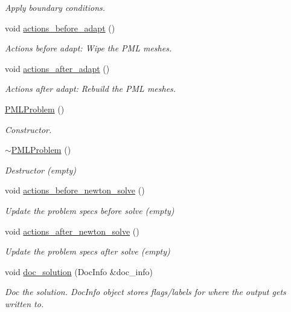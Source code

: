 \begin{DoxyCompactItemize}
\begin{DoxyCompactList}\small\item\em Apply boundary conditions. \end{DoxyCompactList}\item 
void \hyperlink{classPMLProblem_a310fb36ad1401d9d975957ecee43accc}{actions\+\_\+before\+\_\+adapt} ()
\begin{DoxyCompactList}\small\item\em Actions before adapt\+: Wipe the P\+ML meshes. \end{DoxyCompactList}\item 
void \hyperlink{classPMLProblem_a732f94d99e7ef65096d6e8d227f9cbc9}{actions\+\_\+after\+\_\+adapt} ()
\begin{DoxyCompactList}\small\item\em Actions after adapt\+: Rebuild the P\+ML meshes. \end{DoxyCompactList}\item 
\hyperlink{classPMLProblem_ae6cc833e2485ad6d37d6dd14105bf407}{P\+M\+L\+Problem} ()
\begin{DoxyCompactList}\small\item\em Constructor. \end{DoxyCompactList}\item 
\hyperlink{classPMLProblem_a4922fc5b0ef4cf43c41ee9149712adb1}{$\sim$\+P\+M\+L\+Problem} ()
\begin{DoxyCompactList}\small\item\em Destructor (empty) \end{DoxyCompactList}\item 
void \hyperlink{classPMLProblem_a13feb001d09f64dcfe44bbe3c6fe3d97}{actions\+\_\+before\+\_\+newton\+\_\+solve} ()
\begin{DoxyCompactList}\small\item\em Update the problem specs before solve (empty) \end{DoxyCompactList}\item 
void \hyperlink{classPMLProblem_ac171a6a2ff881984b3e057036cbbc414}{actions\+\_\+after\+\_\+newton\+\_\+solve} ()
\begin{DoxyCompactList}\small\item\em Update the problem specs after solve (empty) \end{DoxyCompactList}\item 
void \hyperlink{classPMLProblem_ae04985b020a9e0526ab829ca316adb26}{doc\+\_\+solution} (Doc\+Info \&doc\+\_\+info)
\begin{DoxyCompactList}\small\item\em Doc the solution. Doc\+Info object stores flags/labels for where the output gets written to. \end{DoxyCompactList}\item 

\end{DoxyCompactItemize}
